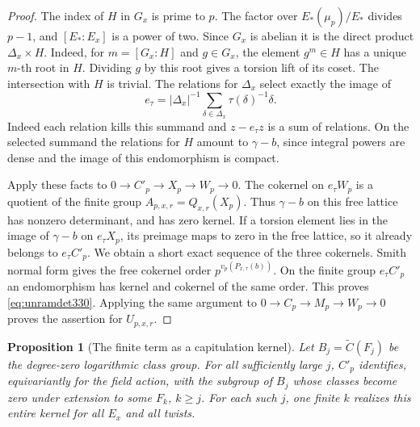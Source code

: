 \documentclass[a4paper,11pt]{article}
\newtheorem{proposition}{Proposition}[section]
\theoremstyle{definition}
\theoremstyle{remark}
\numberwithin{equation}{section}
\begin{document}
\begin{proof}
The index of \(H\) in \(G_x\) is prime to \(p\). The factor
over \(E_*(\mu_p)/E_*\) divides \(p-1\), and \([E_*:E_x]\)
is a power of two. Since \(G_x\) is abelian it is the direct
product \(\Delta_x\times H\). Indeed, for \(m=[G_x:H]\) and
\(g\in G_x\), the element \(g^m\in H\) has a unique \(m\)-th
root in \(H\). Dividing \(g\) by this root gives a torsion lift
of its coset. The intersection with \(H\) is trivial.
The relations for \(\Delta_x\) select exactly the image of
\[
 e_\tau=|\Delta_x|^{-1}\sum_{\delta\in\Delta_x}\tau(\delta)^{-1}\delta .
\]
Indeed each relation kills this summand and \(z-e_\tau z\) is
a sum of relations. On the selected summand the relations for
\(H\) amount to \(\gamma-b\), since integral powers are dense
and the image of this endomorphism is compact.

Apply these facts to \(0\to C'_p\to X_p\to W_p\to0\).
The cokernel on \(e_\tau W_p\) is a quotient of the finite
group \(A_{p,x,r}=Q_{x,r}(X_p)\). Thus \(\gamma-b\) on this
free lattice has nonzero determinant, and has zero kernel.
If a torsion element lies in the image of \(\gamma-b\) on
\(e_\tau X_p\), its preimage maps to zero in the free lattice,
so it already belongs to \(e_\tau C'_p\). We obtain a short
exact sequence of the three cokernels. Smith normal form gives
the free cokernel order \(p^{v_p(P_{x,\tau}(b))}\). On the
finite group \(e_\tau C'_p\) an endomorphism has kernel and
cokernel of the same order. This proves \eqref{eq:unramdet330}.
Applying the same argument to \(0\to C_p\to M_p\to W_p\to0\)
proves the assertion for \(U_{p,x,r}\).
\end{proof}

\begin{proposition}[The finite term as a capitulation kernel]\leavevmode
\label{prop:capmodule330}
Let \(B_j=\widetilde C(F_j)\) be the degree-zero logarithmic
class group. For all sufficiently large \(j\), \(C'_p\)
identifies, equivariantly for the field action, with the subgroup
of \(B_j\) whose classes become zero under extension to
some \(F_k\), \(k\ge j\). For each such \(j\), one finite
\(k\) realizes this entire kernel for all \(E_x\) and all twists.
\end{proposition}
\end{document}
